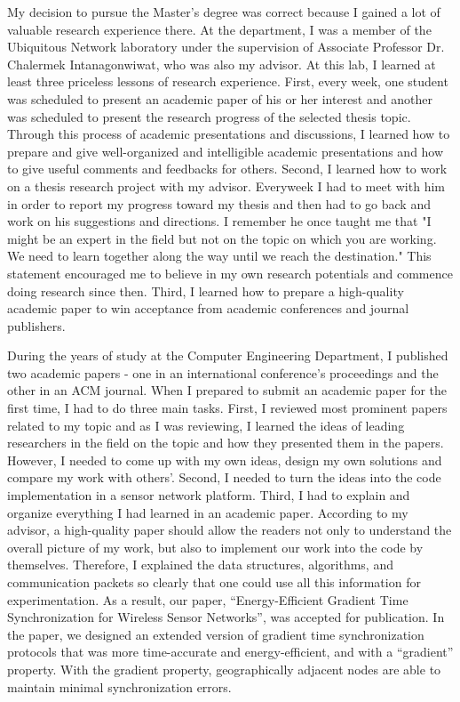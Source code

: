 \documentclass[a4paper,10pt]{report}
\begin{document}
\vspace{0.2cm}
My decision to pursue the Master's degree was correct because I gained a lot of valuable research experience there. At the department, I was a member of the Ubiquitous Network laboratory under the supervision of Associate Professor Dr. Chalermek Intanagonwiwat, who was also my advisor. At this lab, I learned at least three priceless lessons of research experience. First, every week, one student was scheduled to present an academic paper of his or her interest and another was scheduled to present the research progress of the selected thesis topic. Through this process of academic presentations and discussions, I learned how to prepare and give well-organized and intelligible academic presentations and how to give useful comments and feedbacks for others. Second, I learned how to work on a thesis research project with my advisor. Everyweek I had to meet with him in order to report my progress toward my thesis and then had to go back and work on his suggestions and directions. I remember he once taught me that "I might be an expert in the field but not on the topic on which you are working. We need to learn together along the way until we reach the destination." This statement encouraged me to believe in my own research potentials and commence doing research since then. Third, I learned how to prepare a high-quality academic paper to win acceptance from academic conferences and journal publishers.

\vspace{0.2cm}
During the years of study at the Computer Engineering Department, I published two academic papers - one in an international conference's proceedings and the other in an ACM journal. When I prepared to submit an academic paper for the first time, I had to do three main tasks. First, I reviewed most prominent papers related to my topic and as I was reviewing, I learned the ideas of leading researchers in the field on the topic and how they presented them in the papers. However, I needed to come up with my own ideas, design my own solutions and compare my work with others'. Second, I needed to turn the ideas into the code implementation in a sensor network platform. Third, I had to explain and organize everything I had learned in an academic paper. According to my advisor, a high-quality paper should allow the readers not only to understand the overall picture of my work, but also to implement our work into the code by themselves. Therefore, I explained the data structures, algorithms, and communication packets so clearly that one could use all this information for experimentation. As a result, our paper, ``Energy-Efficient Gradient Time Synchronization for Wireless Sensor Networks'', was accepted for publication. In the paper, we designed an extended version of gradient time synchronization protocols that was more time-accurate and energy-efficient, and with a ``gradient'' property. With the gradient property, geographically adjacent nodes are able to maintain minimal synchronization errors.
\end{document}
